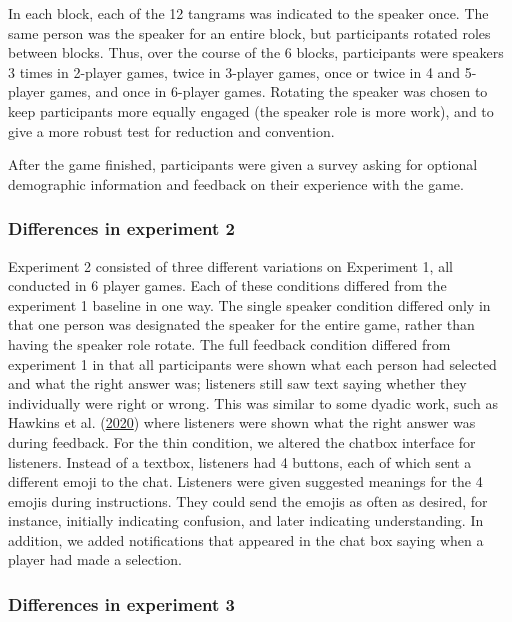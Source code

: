\documentclass[
  english,
  a4paper,
]{article}
\begin{document}
In each block, each of the 12 tangrams was indicated to the speaker once. The same person was the speaker for an entire block, but participants rotated roles between blocks. Thus, over the course of the 6 blocks, participants were speakers 3 times in 2-player games, twice in 3-player games, once or twice in 4 and 5-player games, and once in 6-player games. Rotating the speaker was chosen to keep participants more equally engaged (the speaker role is more work), and to give a more robust test for reduction and convention.

After the game finished, participants were given a survey asking for optional demographic information and feedback on their experience with the game.

\hypertarget{differences-in-experiment-2}{%
\subsubsection{Differences in experiment 2}\label{differences-in-experiment-2}}

Experiment 2 consisted of three different variations on Experiment 1, all conducted in 6 player games. Each of these conditions differed from the experiment 1 baseline in one way. The single speaker condition differed only in that one person was designated the speaker for the entire game, rather than having the speaker role rotate. The full feedback condition differed from experiment 1 in that all participants were shown what each person had selected and what the right answer was; listeners still saw text saying whether they individually were right or wrong. This was similar to some dyadic work, such as Hawkins et al. (\protect\hyperlink{ref-hawkinsCharacterizingDynamicsLearning2020}{2020}) where listeners were shown what the right answer was during feedback. For the thin condition, we altered the chatbox interface for listeners. Instead of a textbox, listeners had 4 buttons, each of which sent a different emoji to the chat. Listeners were given suggested meanings for the 4 emojis during instructions. They could send the emojis as often as desired, for instance, initially indicating confusion, and later indicating understanding. In addition, we added notifications that appeared in the chat box saying when a player had made a selection.

\hypertarget{differences-in-experiment-3}{%
\subsubsection{Differences in experiment 3}\label{differences-in-experiment-3}}
\end{document}
